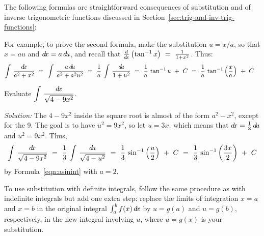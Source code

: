 \divider
\vspace{3mm}

The following formulas are straightforward consequences of substitution and  of inverse trigonometric functions discussed in Section~\ref{sec:trig-and-inv-trig-functions}:
\newpage
{}

For example, to prove the second formula, make the substitution
$u = x/a$, so that $x = au$ and $d\!x= a\,d\!u$, and recall that
$\frac{d}{d\!x}\left(\tan^{-1}x\right) ~=~ \frac{1}{1 + x^2}$. Thus:
\[
\int\,\frac{d\!x}{a^2 + x^2} ~=~ \int\,\frac{a\,d\!u}{a^2 + a^2 u^2} ~=~
\frac{1}{a}\,\int\,\frac{d\!u}{1 + u^2} ~=~
\frac{1}{a}\,\tan^{-1}u ~+~ C ~=~
\frac{1}{a}\,\tan^{-1}\left(\frac{x}{a}\right) ~+~ C \quad\relax
\]

\begin{exmp}\label{exmp:subst10}
\noindent Evaluate $\displaystyle\int\,\dfrac{d\!x}{\sqrt{4 - 9x^2}}$.\vspace{1mm}
\par\noindent\emph{Solution:} The $4 - 9x^2$ inside the square root is almost of
the form $a^2 - x^2$, except for the 9. The goal is to have $u^2 = 9x^2$, so let
$u = 3x$, which means that $d\!x = \frac{1}{3}\,d\!u$ and $u^2 = 9x^2$. Thus,
\[
\int\,\dfrac{d\!x}{\sqrt{4 - 9x^2}} ~=~ \frac{1}{3}\,\int\,\dfrac{d\!u}{\sqrt{4 - u^2}}
~=~ \frac{1}{3}\,\sin^{-1}\left(\frac{u}{2}\right) ~+~ C ~=~
\frac{1}{3}\,\sin^{-1}\left(\frac{3x}{2}\right) ~+~ C
\]
by Formula~\ref{eqn:asinint} with $a = 2$.
\end{exmp}
\divider
\vspace{3mm}

To use substitution with definite integrals, follow the same procedure as with
indefinite integrals but add one extra step: replace the limits of integration
$x=a$ and $x=b$ in the original integral $\int_a^b f(x)\,d\!x$ by $u = g(a)$ and
$u= g(b)$, respectively, in the new integral involving $u$, where $u=g(x)$ is
your substitution.

